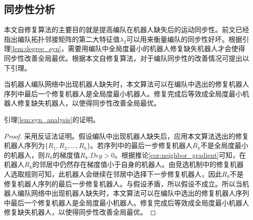 \subsection{同步性分析}
本文自修复算法的主要目的就是提高编队在机器人缺失后的运动同步性。前文已经指出编队拓扑邻接矩阵的第二大特征值$\lambda_2$可以用来衡量编队的同步性好坏。根据引理\ref{lem:degree_syn}，需要用编队中全局度最小的机器人修复缺失机器人才会使得同步性改善全局最优。根据本文自修复算法，对于编队同步性的改善情况可提出以下引理。
\begin{lem}
	\label{lem:syn_analysis}
	当机器人编队网络中出现机器人缺失时，本文算法可以在编队中选出的修复机器人序列中最后一个修复机器人是全局度最小机器人。修复完成后等效成全局度最小机器人修复缺失机器人，以使得同步性改善全局最优。
	
	引理\ref{lem:syn_analysis}的证明。
	
	\begin{proof}
		采用反证法证明。假设编队中出现机器人缺失后，应用本文算法选出的修复机器人序列为$\{R_1,R_2,\dots,R_k\}$。若序列中的最后一步修复机器人$R_k$不是全局度最小的机器人，则$R_k$的梯度值$R_k.Deg > 0$。根据推论\ref{cor:neighbor_gradient}可知，在机器人$R_k$的邻居中仍然存在梯度值小于自身的机器人。由竞选机制中的修复机器人选取规则可知，此机器人会继续在邻居中选择下一步修复机器人，因此$R_k$不是修复机器人序列的最后一步修复机器人。与假设矛盾，所以假设不成立。所以当机器人编队网络中出现机器人缺失时，本文算法可以在编队中选出的修复机器人序列中最后一个修复机器人是全局度最小机器人。修复完成后等效成全局度最小机器人修复缺失机器人，以使得同步性改善全局最优。
	\end{proof}	
\end{lem}

